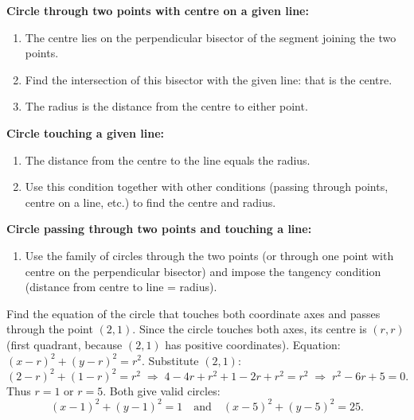\documentclass[11pt]{article}
\begin{document}
\begin{methode}
\textbf{Circle through two points with centre on a given line:}
\begin{enumerate}
\item The centre lies on the perpendicular bisector of the segment joining the two points.
\item Find the intersection of this bisector with the given line: that is the centre.
\item The radius is the distance from the centre to either point.
\end{enumerate}
\textbf{Circle touching a given line:}
\begin{enumerate}
\item The distance from the centre to the line equals the radius.
\item Use this condition together with other conditions (passing through points, centre on a line, etc.) to find the centre and radius.
\end{enumerate}
\textbf{Circle passing through two points and touching a line:}
\begin{enumerate}
\item Use the family of circles through the two points (or through one point with centre on the perpendicular bisector) and impose the tangency condition (distance from centre to line = radius).
\end{enumerate}
\end{methode}

\begin{exoresolu}
Find the equation of the circle that touches both coordinate axes and passes through the point $(2,1)$.
\tcblower
Since the circle touches both axes, its centre is $(r,r)$ (first quadrant, because $(2,1)$ has positive coordinates). Equation: $(x-r)^2+(y-r)^2=r^2$.
Substitute $(2,1)$:
\[
(2-r)^2+(1-r)^2=r^2 \;\Longrightarrow\; 4-4r+r^2+1-2r+r^2=r^2 \;\Longrightarrow\; r^2-6r+5=0.
\]
Thus $r=1$ or $r=5$. Both give valid circles:
\[
(x-1)^2+(y-1)^2=1 \quad\text{and}\quad (x-5)^2+(y-5)^2=25.
\]
\end{exoresolu}
\end{document}
